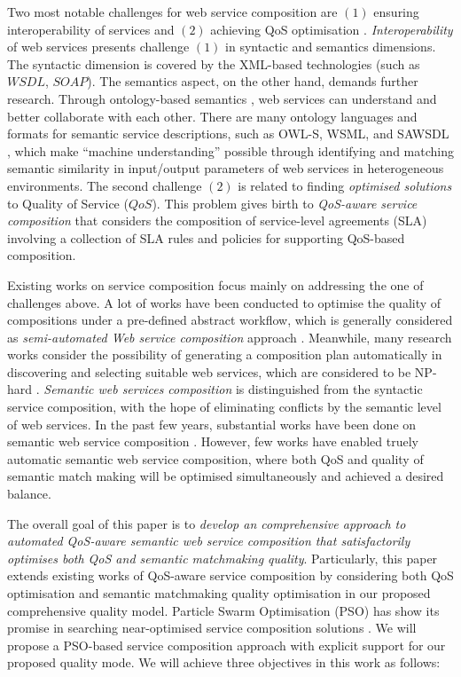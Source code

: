 \documentclass{IEEEtran}
\begin{document}
Two most notable challenges for web service composition are $(1)$ ensuring interoperability of services and $(2)$ achieving QoS optimisation \cite{fensel2011semantic}. \textit{Interoperability} of web services presents challenge $(1)$ in syntactic and semantics dimensions. The syntactic dimension is covered by the XML-based technologies (such as $WSDL$, $SOAP$). The semantics aspect, on the other hand, demands further research. Through ontology-based semantics \cite{o2005review}, web services can understand and better collaborate with each other. There are many ontology languages and formats for semantic service descriptions, such as OWL-S, WSML, and SAWSDL \cite{petrie2016web}, which make ``machine understanding'' possible through identifying and matching semantic similarity in input/output parameters of web services in heterogeneous environments. The second challenge $(2)$ is related to finding \textit{optimised solutions} to Quality of Service ($QoS$). This problem gives birth to \textit{QoS-aware service composition} that considers the composition of service-level agreements (SLA) \cite {sahai2002automated} involving a collection of SLA rules and policies for supporting QoS-based composition.

Existing works on service composition focus mainly on addressing the one of challenges above. A lot of works have been conducted to optimise the quality of compositions under a pre-defined abstract workflow, which is generally considered as \textit{semi-automated Web service composition} approach \cite{parejo2008qos,bahadori2009optimal}. Meanwhile, many research works consider the possibility of generating a composition plan automatically in discovering and selecting suitable web services, which are considered to be NP-hard \cite{moghaddam2014service}. \textit{Semantic web services composition} is distinguished from the syntactic service composition, with the hope of eliminating conflicts by the semantic level of web services. In the past few years, substantial works have been done on semantic web service composition \cite{boustil2014semantic, mier2015integrated, bansal2016generalized}. However, few works have enabled truely automatic semantic web service composition, where both QoS and quality of semantic match making will be optimised simultaneously and achieved a desired balance.

The overall goal of this paper is to \textit{develop an comprehensive approach to automated QoS-aware semantic web service composition that satisfactorily optimises both QoS and semantic matchmaking quality}. Particularly, this paper extends existing works of QoS-aware service composition by considering both QoS optimisation and semantic matchmaking quality optimisation in our proposed comprehensive quality model. Particle Swarm Optimisation (PSO) has show its promise in searching near-optimised service composition solutions \cite{da2016particle}. We will propose a PSO-based service composition approach with explicit support for our proposed quality mode. We will achieve three objectives in this work as follows:
\end{document}
